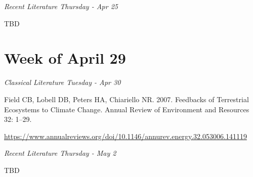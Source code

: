 \documentclass[12pt, notitlepage]{article}   	%
\begin{document}
{\textit{Recent Literature Thursday - Apr 25} \par
TBD \par

\section*{Week of April 29}
\textit{Classical Literature Tuesday - Apr 30} \par
Field CB, Lobell DB, Peters HA, Chiariello NR. 2007. Feedbacks of Terrestrial Ecosystems 
to Climate Change. Annual Review of Environment and Resources 32: 1–29. \par
\url{https://www.annualreviews.org/doi/10.1146/annurev.energy.32.053006.141119}

\textit{Recent Literature Thursday - May 2} \par
TBD \par

} %
\end{document}
